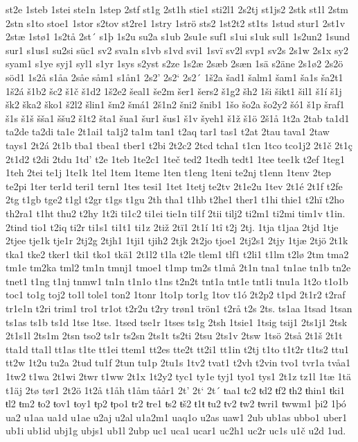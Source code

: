 st2e
1steb
1stei
ste1n
1step
2stf
st1g
2st1h
stie1
sti2l1
2s2tj
st1js2
2stk
st1l
2stm
2stn
s1to
stoe1
1stor
s2tov
st2re1
1stry
1strö
sts2
1st2t2
st1ts
1stud
stur1
2st1v
2stæ
1stø1
1s2tå
2st´
s1þ
1s2u
su2a
s1ub
2su1e
suf1
s1ui
s1uk
sul1
1s2un2
1sund
sur1
s1us1
su2si
süc1
sv2
sva1n
s1vb
s1vd
svi1
1svï
sv2l
svp1
sv2s
2s1w
2s1x
sy2
syam1
s1ye
syj1
syl1
s1yr
1sys
s2yst
s2ze
1s2æ
2sæb
2sæn
1sä
s2äne
2s1ø2
2s2ö
söd1
1s2å
s1åa
2såe
såm1
s1ån1
2s2'
2s2`
2s2´
1š2a
šad1
šalm1
šam1
ša1s
ša2t1
1š2á
š1b2
šc2
š1č
š1d2
1š2e2
šeal1
še2m
šer1
šers2
š1g2
šh2
1ši
šikt1
šil1
š1í
š1j
šk2
ška2
ško1
š2l2
šlin1
šm2
šmá1
2š1n2
šni2
šnib1
1šo
šo2a
šo2y2
šó1
š1p
šraf1
š1s
š1š
šša1
ššu2
š1t2
šta1
šua1
šur1
šus1
š1v
šyeh1
š1ž
š1ö
2š1å
1t2a
2tab
ta1d1
ta2de
ta2di
ta1e
2t1ai1
ta1j2
ta1m
tan1
t2aq
tar1
tas1
t2at
2tau
tava1
2taw
tays1
2t2á
2t1b
tba1
tbea1
tber1
t2bi
2t2c2
2tcd
tcha1
t1cn
1tco
tco1j2
2t1č
2t1ç
2t1d2
t2di
2tdu
1td'
t2e
1teb
1te2c1
1teč
ted2
1tedh
tedt1
1tee
tee1k
t2ef
1teg1
1teh
2tei
te1j
1te1k
1tel
1tem
1teme
1ten
t1eng
1teni
te2nj
t1enn
1tenv
2tep
te2pi
1ter
ter1d
teri1
tern1
1tes
tesi1
1tet
1tetj
te2tv
2t1e2u
1tev
2t1é
2t1f
t2fe
2tg
t1gb
tge2
t1gl
t2gr
t1gs
t1gu
2th
tha1
t1hb
t2he1
ther1
t1hi
thie1
t2hï
t2ho
th2ra1
t1ht
thu2
t2hy
1t2i
ti1c2
ti1ei
tie1n
ti1f
2tii
tilj2
ti2m1
ti2mi
tim1v
t1in.
2tind
tio1
t2iq
ti2r
ti1s1
ti1t1
ti1z
2tiž
2tï1
2t1í
1tî
t2j
2tj.
1tja
t1jaa
2tjd
1tje
2tjee
tje1k
tje1r
2tj2g
2tjh1
1tji1
tjih2
2tjk
2t2jo
tjoe1
2tj2s1
2tjy
1tjæ
2tjö
2t1k
tka1
tke2
tker1
tki1
tko1
tkä1
2t1l2
t1la
t2le
tlem1
tlf1
t2li1
t1lm
t2lø
2tm
tma2
tm1e
tm2ka
tml2
tm1n
tmnj1
tmoe1
t1mp
tm2s
t1må
2t1n
tna1
tn1ae
tn1b
tn2e
tnet1
t1ng
t1nj
tnmw1
tn1n
t1n1o
t1ns
t2n2t
tnt1a
tnt1e
tnt1i
tnu1a
1t2o
t1o1b
toc1
to1g
toj2
to1l
tole1
ton2
1tonr
1to1p
tor1g
1tov
t1ó
2t2p2
t1pd
2t1r2
t2raf
tr1e1n
t2ri
trim1
tro1
tr1ot
t2r2u
t2ry
trøn1
trön1
t2rå
t2s
2ts.
ts1aa
1tsad
1tsan
ts1as
ts1b
ts1d
1tse
1tse.
1tsed
tse1r
1tses
ts1g
2tsh
1tsie1
1tsig
tsij1
2ts1j1
2tsk
2t1s1l
2ts1m
2tsn
tso2
ts1r
ts2sn
2ts1t
ts2ti
2tsu
2ts1v
2tsw
1tsö
2tså
2t1š
2t1t
tta1d
tta1l
tt1as
t1te
tt1ei
ttem1
tt2es
tte2t
tt2i1
tt1in
t2tj
t1to
t1t2r
t1ts2
ttu1
tt2w
1t2u
tu2a
2tud
tu1f
2tun
tu1p
2tu1s
1tv2
tvat1
t2vh
t2vin
tvo1
tvr1a
tvåa1
1tw2
t1wa
2t1wi
2twr
t1ww
2t1x
1t2y2
tyc1
ty1e
tyj1
tyo1
tys1
2t1z
tz1l
1tæ
1tä
t1äj
2tø
tør1
2t2ö
1t2å
t1åh
t1åm
tåår1
2t'
2t`
2t´
ŧaa1
ŧc2
ŧd2
ŧf2
ŧh2
ŧhin1
ŧki1
ŧl2
ŧm2
ŧo2
ŧov1
ŧoy1
ŧp2
ŧpo1
ŧr2
ŧre1
ŧs2
ŧš2
ŧ1ŧ
ŧu2
ŧv2
ŧw2
ŧwri1
ŧwwm1
þi2
1þó
ua2
u1aa
ua1d
u1ae
u2aj
u2al
u1a2m1
uaq1o
u2as
uaw1
2ub
ub1as
ubbo1
uber1
ub1i
ub1id
ubj1g
ubjs1
ub1l
2ubp
uc1
uca1
ucar1
uc2h1
uc2r
uc1s
u1č
u2d
1ud.
